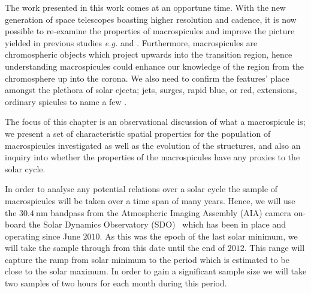The work presented in this work comes at an opportune time. With the new generation of space telescopes boasting higher resolution and cadence, it is now possible to re-examine the properties of macrospicules and improve the picture yielded in previous studies \emph{e.g.} \cite{Bohlin1975} and \cite{Dere89}. Furthermore, macrospicules are chromospheric objects which project upwards into the transition region, hence understanding macrospicules could enhance our knowledge of the region from the chromosphere up into the corona. We also need to confirm the features' place amongst the plethora of solar ejecta; jets, surges, rapid blue, or red, extensions, ordinary spicules to name a few \cite{Tsiropoula2012}.

The focus of this chapter is an observational discussion of what a macrospicule is; we present a set of characteristic spatial properties for the population of macrospicules investigated as well as the evolution of the structures, and also an inquiry into whether the properties of the macrospicules have any proxies to the solar cycle.

In order to analyse any potential relations over a solar cycle the sample of macrospicules will be taken over a time span of many years. Hence, we will use the $30.4\ \textrm{nm}$ bandpass from the Atmospheric Imaging Assembly (AIA) camera on-board the Solar Dynamics Observatory (SDO) \cite{AIAspec}\, which has been in place and operating since June $2010$. As this was the epoch of the last solar minimum, we will take the sample through from this date until the end of $2012$. This range will capture the ramp from solar minimum to the period which is estimated to be close to the solar maximum. In order to gain a significant sample size we will take two samples of two hours for each month during this period.

